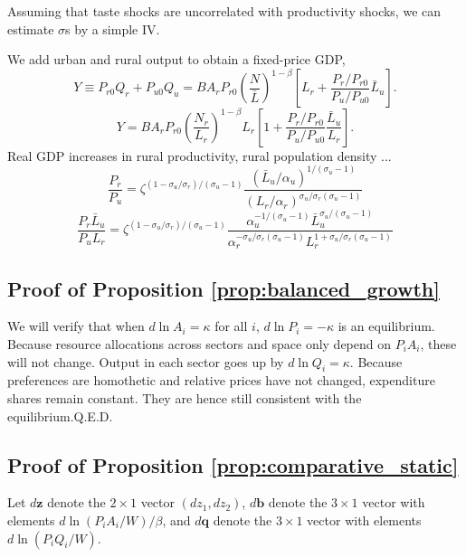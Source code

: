 \documentclass[12pt]{article}
\begin{document}
Assuming that taste shocks are uncorrelated with productivity shocks, we can estimate $\sigma$s by a simple IV.

We add urban and rural output to obtain a fixed-price GDP,
\begin{equation}
	Y \equiv
	P_{r0}Q_r + P_{u0}Q_u
	=
	B A_r P_{r0}\left(\frac {N}
	{{\bar L}}
\right)^{1-\beta}
\left[
L_r
+
\frac{P_r/P_{r0}}{P_u/P_{u0}}
\bar L_u\right].
\end{equation}
\[
	Y =
	B A_r P_{r0}\left(\frac {N_r}
	{L_r}
\right)^{1-\beta} L_r
\left[
1
+
\frac{P_r/P_{r0}}{P_u/P_{u0}}
\frac{\bar L_u}{L_r}
\right].
\]
Real GDP increases in rural productivity, rural population density ...
\[
\frac {P_r}{P_u}
=
\zeta^{(1-\sigma_u/\sigma_r)/(\sigma_u-1)}
\frac {(\bar L_u/\alpha_u)^{1/(\sigma_u-1)}}
{(L_r/\alpha_r)^{\sigma_u/\sigma_r(\sigma_u-1)}}
\]
\[
\frac {P_r \bar L_u}{P_uL_r}
=
\zeta^{(1-\sigma_u/\sigma_r)/(\sigma_u-1)}
\frac {\alpha_u^{-1/(\sigma_u-1)}\bar L_u^{\sigma_u/(\sigma_u-1)}}
{\alpha_r^{-\sigma_u/\sigma_r(\sigma_u-1)}
L_r^{1+\sigma_u/\sigma_r(\sigma_u-1)}}
\]


\subsection{Proof of Proposition \ref{prop:balanced_growth}}
We will verify that when $d\ln A_i=\kappa$ for all $i$, $d\ln P_i=-\kappa$ is an equilibrium. Because resource allocations across sectors and space only depend on $P_iA_i$, these will not change. Output in each sector goes up by $d\ln Q_i = \kappa$. Because preferences are homothetic and relative prices have not changed, expenditure shares remain constant. They are hence still consistent with the equilibrium.\hfill Q.E.D.

\subsection{Proof of Proposition \ref{prop:comparative_static}}
Let $d\mathbf z$ denote the $2\times1$ vector $(dz_1,dz_2)$, $d\mathbf b$ denote the $3\times1$ vector with elements $d\ln(P_iA_i/W)/\beta$, and $d\mathbf q$ denote the $3\times1$ vector with elements $d\ln(P_iQ_i/W)$.
\end{document}
